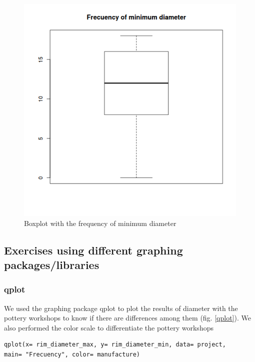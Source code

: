 \documentclass[10pt,a4paper]{article}
\begin{document}
\begin{figure}[htp]
     \centering
\includegraphics[scale=0.50]{boxplotmin.png}
\caption{Boxplot with the frequency of minimum diameter}
\label{boxmin}
\end{figure} 


\newpage

\subsection{Exercises using different graphing packages/libraries} 


\subsubsection{qplot}

We used the graphing package qplot to plot the results of diameter with the pottery workshops to know if there are differences among them (fig. \ref{qplot}). We also performed the color scale to differentiate the pottery workshops 

\begin{verbatim}
qplot(x= rim_diameter_max, y= rim_diameter_min, data= project, 
main= "Frecuency", color= manufacture) 
\end{verbatim}
\end{document}
